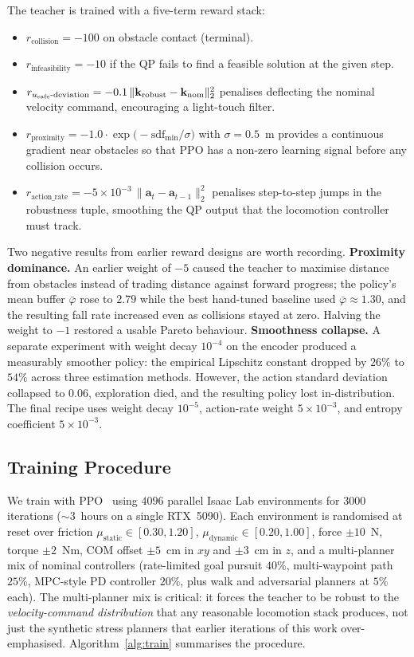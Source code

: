 \documentclass{article}
\newcommand{\bk}{\mathbf{k}}
\newcommand{\ba}{\mathbf{a}}
\newcommand{\sdf}{\mathrm{sdf}}
\begin{document}
The teacher is trained with a five-term reward stack:
\begin{itemize}[leftmargin=*,itemsep=2pt,topsep=2pt]
\item $r_\text{collision} = -100$ on obstacle contact (terminal).
\item $r_\text{infeasibility} = -10$ if the QP fails to find a feasible
      solution at the given step.
\item $r_{u_\text{safe}\text{-deviation}} = -0.1\,\|\bk_\textup{robust}-\bk_\textup{nom}\|_2^2$
      penalises deflecting the nominal velocity command, encouraging a
      light-touch filter.
\item $r_\text{proximity} = -1.0\cdot\exp\!\bigl(-\sdf_{\min}/\sigma\bigr)$
      with $\sigma=0.5$~m provides a continuous gradient near obstacles
      so that PPO has a non-zero learning signal before any collision
      occurs.
\item $r_\text{action\_rate} = -5\!\times\!10^{-3}\,\|\ba_t-\ba_{t-1}\|_2^2$
      penalises step-to-step jumps in the robustness tuple, smoothing
      the QP output that the locomotion controller must track.
\end{itemize}
Two negative results from earlier reward designs are worth recording.
\textbf{Proximity dominance.} An earlier weight of $-5$ caused the
teacher to maximise distance from obstacles instead of trading distance
against forward progress; the policy's mean buffer $\bar\varphi$ rose to
$2.79$ while the best hand-tuned baseline used $\bar\varphi\approx 1.30$,
and the resulting fall rate increased even as collisions stayed at zero.
Halving the weight to $-1$ restored a usable Pareto behaviour.
\textbf{Smoothness collapse.} A separate experiment with weight decay
$10^{-4}$ on the encoder produced a measurably smoother policy: the
empirical Lipschitz constant dropped by $26\%$ to $54\%$ across three
estimation methods. However, the action standard deviation collapsed to
$0.06$, exploration died, and the resulting policy lost in-distribution.
The final recipe uses weight decay $10^{-5}$, action-rate weight
$5\!\times\!10^{-3}$, and entropy coefficient $5\!\times\!10^{-3}$.

\subsection{Training Procedure}

We train with PPO~\citep{schulman2017proximal} using $4096$ parallel Isaac Lab
environments for $3000$ iterations ($\sim 3$~hours on a single RTX~5090). Each
environment is randomised at reset over friction
$\mu_\text{static}\in[0.30,1.20]$, $\mu_\text{dynamic}\in[0.20,1.00]$, force
$\pm 10$~N, torque $\pm 2$~Nm, COM offset $\pm 5$~cm in $xy$ and $\pm 3$~cm in
$z$, and a multi-planner mix of nominal controllers
(rate-limited goal pursuit $40\%$, multi-waypoint path $25\%$, MPC-style
PD controller $20\%$, plus walk and adversarial planners at $5\%$ each). The
multi-planner mix is critical: it forces the teacher to be robust to the
\emph{velocity-command distribution} that any reasonable locomotion stack
produces, not just the synthetic stress planners that earlier iterations of
this work over-emphasised. Algorithm~\ref{alg:train} summarises the procedure.
\end{document}
